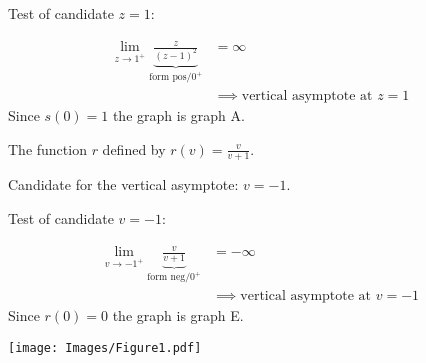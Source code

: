 \documentclass[nooutcomes]{ximera}
\renewenvironment{freeResponse}{
\ifhandout\setbox0\vbox\bgroup\else
\begin{trivlist}\item[\hskip \labelsep\bfseries Solution:\hspace{2ex}]
\fi}
{\ifhandout\egroup\else
\end{trivlist}
\fi}
\begin{document}
\begin{problem}
\begin{enumerate}
\begin{freeResponse}
        Test of candidate $z = 1$:

        \begin{align*}
          \lim_{z \to 1^+} \underbrace{\frac{z}{(z-1)^2}}_{\text{form $\text{pos}/0^+$}} &= \infty \\
          &\implies \mbox{vertical asymptote at $z = 1$}
        \end{align*}
        Since $s(0) = 1$ the graph is graph A.        
      \end{freeResponse}


    \item
      The function $r$ defined by $\displaystyle r(v) = \frac{v}{v+1}$.
      \begin{freeResponse}
        Candidate for the vertical asymptote: $v = -1$.

        Test of candidate $v = -1$:

        \begin{align*}
          \lim_{v \to -1^+} \underbrace{\frac{v}{v+1}}_{\text{form $\text{neg}/0^+$}} &= -\infty \\
          &\implies \mbox{vertical asymptote at $v = -1$}
        \end{align*}
        Since $r(0) = 0$ the graph is graph E.
      \end{freeResponse}

  \end{enumerate}
  \begin{center}
    \texttt{[image: Images/Figure1.pdf]}
  \end{center}
\end{problem}
\end{document}
